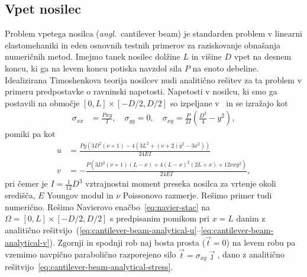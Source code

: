 \documentclass[12pt,a4paper,twoside]{article}
\theoremstyle{definition} %
\theoremstyle{plain} %
\numberwithin{equation}{section}
\newcommand{\vt}{\vec{t}}
\newcommand{\vj}{\vec{\jmath}}
\newcommand{\ts}{\sigma}
\newcommand{\ang}[1]{(\hspace{-1.5px}\textit{angl.}\ #1)}
\begin{document}
\subsection{Vpet nosilec}
Problem vpetega nosilca \ang{cantilever beam} je standarden problem v linearni elastomehaniki in eden
osnovnih testnih primerov za raziskovanje obnašanja numeričnih metod. Imejmo tanek nosilec dolžine
$L$ in višine $D$ vpet na desnem koncu, ki ga na levem koncu potiska navzdol sila $P$ na enoto
debeline. Idealizirana Timoshenkova teorija nosilcev nudi analitično rešitev za ta problem v primeru
predpostavke o ravninski napetosti. Napetosti v nosilcu, ki smo ga postavili na območje $[0, L]
\times [-D/2, D/2]$ so izpeljane v~\cite[str.\ 284--289, enačba 7.4.55]{slaughter2012linearized} in
se izražajo kot
\begin{align}
  \ts_{xx} &= \frac{Pxy}{I}, \quad \ts_{yy} = 0, \quad \ts_{xy} = \frac{P}{2I} \left( \frac{D^2}{4}
  - y^2 \right),
  \label{eq:cantilever-beam-analytical-stress}
\end{align}
pomiki pa kot
\begin{align}
  u &= \frac{P y \left(3 D^2 (\nu +1)-4 \left(3 L^2+(\nu +2) y^2-3 x^2\right)\right)}{24 E I}
  \label{eq:cantilever-beam-analytical-u} \\
  v &= -\frac{P \left(3 D^2 (\nu +1) (L-x)+4 (L-x)^2 (2 L+x)+12 \nu  x y^2\right)}{24 E I}, \label{eq:cantilever-beam-analytical-v}
\end{align}
pri čemer je $I = \frac{1}{12} D^3$ vztrajnostni moment preseka nosilca za vrtenje okoli središča,
$E$ Youngov modul in $\nu$ Poissonovo razmerje. Rešimo primer tudi numerično. Rešimo Navierovo
enačbo~\eqref{eq:navier-stac} na $\Omega = [0, L] \times [-D/2, D/2]$ s predpisanim pomikom pri $x =
L$ danim z analitično
rešitvijo~(\ref{eq:cantilever-beam-analytical-u}--\ref{eq:cantilever-beam-analytical-v}). Zgornji
in spodnji rob naj bosta prosta ($\vt = 0$) na levem robu pa vzemimo navpično parabolično
razporejeno silo $\vt = \ts_{xy}\vj$, dano z analitično
rešitvijo~\eqref{eq:cantilever-beam-analytical-stress}.
\end{document}
